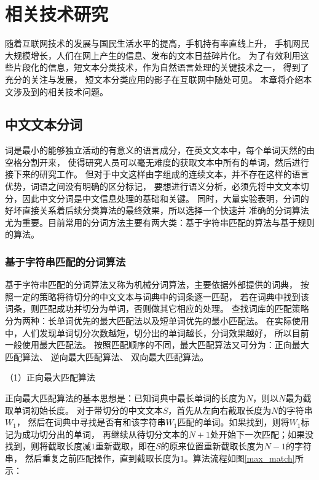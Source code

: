 \documentclass{standalone}
\begin{document}
\chapter{相关技术研究}
随着互联网技术的发展与国民生活水平的提高，手机持有率直线上升，
手机网民大规模增长，人们在网上产生的信息、发布的文本日益碎片化。
为了有效利用这些片段化的信息，短文本分类技术，作为自然语言处理的关键技术之一，
得到了充分的关注与发展，
短文本分类应用的影子在互联网中随处可见。
本章将介绍本文涉及到的相关技术问题。
\iffalse
\section{中文文本分词}
\label{word_seg}
词是最小的能够独立活动的有意义的语言成分，在英文文本中，每个单词天然的由空格分割开来，
使得研究人员可以毫无难度的获取文本中所有的单词，然后进行接下来的研究工作。
但对于中文这样由字组成的连续文本，并不存在这样的语言优势，词语之间没有明确的区分标记，
要想进行语义分析，必须先将中文文本切分，因此中文分词是中文信息处理的基础和关键。
同时，大量实验表明，分词的好坏直接关系着后续分类算法的最终效果，所以选择一个快速并
准确的分词算法尤为重要。目前常用的分词方法主要有两大类：基于字符串匹配的算法与基于规则的算法。
\subsection{基于字符串匹配的分词算法}
基于字符串匹配的分词算法又称为机械分词算法，主要依据外部提供的词典，
按照一定的策略将待切分的中文文本与词典中的词条逐一匹配，
若在词典中找到该词条，则匹配成功并切分为单词，否则做其它相应的处理。
查找词库的匹配策略分为两种：长单词优先的最大匹配法以及短单词优先的最小匹配法。
在实际使用中，人们发现单词切分次数越短，切分出的单词越长，分词效果越好，
所以目前一般使用最大匹配法。
按照匹配顺序的不同，最大匹配算法又可分为：正向最大匹配算法、
逆向最大匹配算法、
双向最大匹配算法。

（1）正向最大匹配算法

正向最大匹配算法的基本思想是：已知词典中最长单词的长度为$N$，则以$N$最为截取单词初始长度。
对于带切分的中文文本$S$，首先从左向右截取长度为$N$的字符串$W_{1}$，
然后在词典中寻找是否有和该字符串$W_{1}$匹配的单词。如果找到，则将$W_{1}$标记为成功切分出的单词，
再继续从待切分文本的$N+1$处开始下一次匹配；如果没找到，则将截取长度减$1$重新截取，即在$S$的原来位置重新截取长度为$N-1$的字符串，
然后重复之前匹配操作，直到截取长度为$1$。算法流程如图\ref{max_match}所示：
\end{document}
